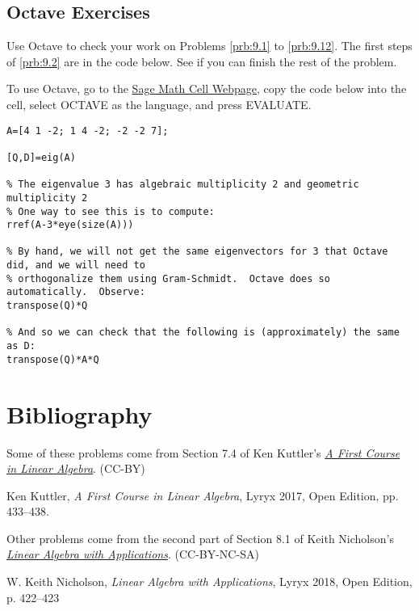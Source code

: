 \documentclass{ximera}
\begin{document}
\subsection*{Octave Exercises}
\begin{problem}\label{oct:ortho_diagonalize}
Use Octave to check your work on Problems \ref{prb:9.1} to \ref{prb:9.12}.   The first steps of \ref{prb:9.2} are in the code below.  See if you can finish the rest of the problem.  

To use Octave, go to the \href{https://sagecell.sagemath.org/}{Sage Math Cell Webpage}, copy the code below into the cell, select OCTAVE as the language, and press EVALUATE.

\begin{verbatim}
A=[4 1 -2; 1 4 -2; -2 -2 7];

[Q,D]=eig(A)

% The eigenvalue 3 has algebraic multiplicity 2 and geometric multiplicity 2
% One way to see this is to compute:
rref(A-3*eye(size(A)))

% By hand, we will not get the same eigenvectors for 3 that Octave did, and we will need to
% orthogonalize them using Gram-Schmidt.  Octave does so automatically.  Observe:
transpose(Q)*Q

% And so we can check that the following is (approximately) the same as D:
transpose(Q)*A*Q
\end{verbatim}

\end{problem}

\section*{Bibliography}
Some of these problems come from Section 7.4 of Ken Kuttler's \href{https://open.umn.edu/opentextbooks/textbooks/a-first-course-in-linear-algebra-2017}{\it A First Course in Linear Algebra}. (CC-BY)

Ken Kuttler, {\it  A First Course in Linear Algebra}, Lyryx 2017, Open Edition, pp. 433--438.  

Other problems come from the second part of Section 8.1 of Keith Nicholson's \href{https://open.umn.edu/opentextbooks/textbooks/linear-algebra-with-applications}{\it Linear Algebra with Applications}. (CC-BY-NC-SA)

W. Keith Nicholson, {\it Linear Algebra with Applications}, Lyryx 2018, Open Edition, p. 422--423 
\end{document}
